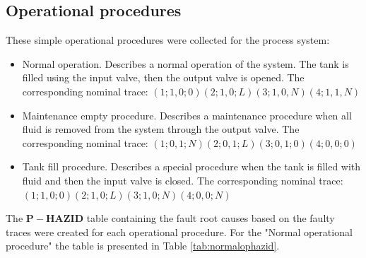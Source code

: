 \documentclass[conference]{IEEEtran}
\begin{document}
\subsection{Operational procedures}

These simple operational procedures were collected for the process system:
\begin{itemize}
\item Normal operation. Describes a normal operation of the system. The tank is filled using the input valve, then the output valve is opened. The corresponding nominal trace:
$(1;1,0;0) (2;1,0;L) (3;1,0,N) (4;1,1,N)$
\item Maintenance empty procedure. Describes a maintenance procedure when all fluid is removed from the system through the output valve. The corresponding nominal trace:
$(1;0,1;N) (2;0,1;L) (3;0,1;0) (4;0,0;0)$
\item Tank fill procedure. Describes a special procedure when the tank is filled with fluid and then the input valve is closed. The corresponding nominal trace:
$(1;1,0;0) (2;1,0;L) (3;1,0;N) (4;0,0;N)$
\end{itemize}

The $\mathbf{P-HAZID}$ table containing the fault root causes based on the faulty traces were created for each operational procedure. For the "Normal operational procedure" the table is presented in Table \ref{tab:normalophazid}.
\end{document}
